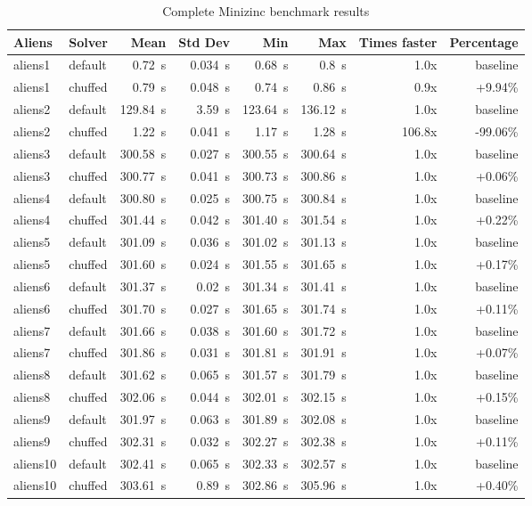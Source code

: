 \documentclass[11pt]{article}
\begin{document}
\begin{table}[h]
  \centering
  \begin{tabular}{|llrrrrrr|}
    \hline
    Aliens & Solver & Mean & Std Dev & Min & Max & Times faster & Percentage \\
    \hline
    aliens1 & default & 0.72~s & 0.034~s & 0.68~s & 0.8~s & 1.0x & baseline \\
    aliens1 & chuffed & 0.79~s & 0.048~s & 0.74~s & 0.86~s & 0.9x & +9.94\% \\
    \hline
    aliens2 & default & 129.84~s & 3.59~s & 123.64~s & 136.12~s & 1.0x & baseline \\
    aliens2 & chuffed & 1.22~s & 0.041~s & 1.17~s & 1.28~s & 106.8x & -99.06\% \\
    \hline
    aliens3 & default & 300.58~s & 0.027~s & 300.55~s & 300.64~s & 1.0x & baseline \\
    aliens3 & chuffed & 300.77~s & 0.041~s & 300.73~s & 300.86~s & 1.0x & +0.06\% \\
    \hline
    aliens4 & default & 300.80~s & 0.025~s & 300.75~s & 300.84~s & 1.0x & baseline \\
    aliens4 & chuffed & 301.44~s & 0.042~s & 301.40~s & 301.54~s & 1.0x & +0.22\% \\
    \hline
    aliens5 & default & 301.09~s & 0.036~s & 301.02~s & 301.13~s & 1.0x & baseline \\
    aliens5 & chuffed & 301.60~s & 0.024~s & 301.55~s & 301.65~s & 1.0x & +0.17\% \\
    \hline
    aliens6 & default & 301.37~s & 0.02~s & 301.34~s & 301.41~s & 1.0x & baseline \\
    aliens6 & chuffed & 301.70~s & 0.027~s & 301.65~s & 301.74~s & 1.0x & +0.11\% \\
    \hline
    aliens7 & default & 301.66~s & 0.038~s & 301.60~s & 301.72~s & 1.0x & baseline \\
    aliens7 & chuffed & 301.86~s & 0.031~s & 301.81~s & 301.91~s & 1.0x & +0.07\% \\
    \hline
    aliens8 & default & 301.62~s & 0.065~s & 301.57~s & 301.79~s & 1.0x & baseline \\
    aliens8 & chuffed & 302.06~s & 0.044~s & 302.01~s & 302.15~s & 1.0x & +0.15\% \\
    \hline
    aliens9 & default & 301.97~s & 0.063~s & 301.89~s & 302.08~s & 1.0x & baseline \\
    aliens9 & chuffed & 302.31~s & 0.032~s & 302.27~s & 302.38~s & 1.0x & +0.11\% \\
    \hline
    aliens10 & default & 302.41~s & 0.065~s & 302.33~s & 302.57~s & 1.0x & baseline \\
    aliens10 & chuffed & 303.61~s & 0.89~s & 302.86~s & 305.96~s & 1.0x & +0.40\% \\

    \hline
  \end{tabular}
  \caption{Complete Minizinc benchmark results}
  \label{table:minizinc-bench-comparative}
\end{table}
\end{document}
